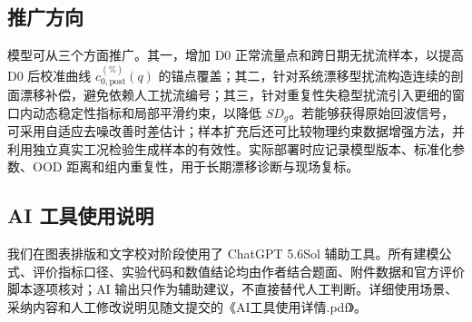 \subsection{推广方向}

模型可从三个方面推广。其一，增加 D0 正常流量点和跨日期无扰流样本，以提高 D0 后校准曲线 $c_{0,\mathrm{post}}^{(\%)}(q)$ 的锚点覆盖；其二，针对系统漂移型扰流构造连续的剖面漂移补偿，避免依赖人工扰流编号；其三，针对重复性失稳型扰流引入更细的窗口内动态稳定性指标和局部平滑约束，以降低 $SD_g$。若能够获得原始回波信号，可采用自适应去噪改善时差估计\cite{Li2025VMDDenoising}；样本扩充后还可比较物理约束数据增强方法\cite{Cai2025PhysConstrainedGAN}，并利用独立真实工况检验生成样本的有效性。实际部署时应记录模型版本、标准化参数、OOD 距离和组内重复性，用于长期漂移诊断与现场复标。

\subsection{AI 工具使用说明}

我们在图表排版和文字校对阶段使用了 ChatGPT 5.6Sol 辅助工具\cite{OpenAICodex2026}。所有建模公式、评价指标口径、实验代码和数值结论均由作者结合题面、附件数据和官方评价脚本逐项核对；AI 输出只作为辅助建议，不直接替代人工判断。详细使用场景、采纳内容和人工修改说明见随文提交的《AI工具使用详情.pdf》。
